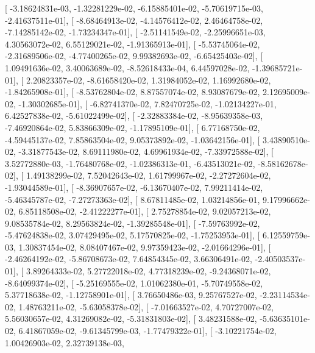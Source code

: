 \documentclass{article}
\begin{document}
       [ -3.18624831e-03,  -1.32281229e-02,  -6.15885401e-02,
         -5.70619715e-03,  -2.41637511e-01],
       [ -8.68464913e-02,  -4.14576412e-02,   2.46464758e-02,
         -7.14285142e-02,  -1.73234347e-01],
       [ -2.51141549e-02,  -2.25996651e-03,   4.30563072e-02,
          6.55129021e-02,  -1.91365913e-01],
       [ -5.53745064e-02,  -2.31689506e-02,  -4.77400265e-02,
          9.99382693e-02,  -6.65425403e-02],
       [  1.09491636e-02,   3.40063689e-02,  -8.52618433e-04,
          6.44597028e-02,  -1.39685721e-01],
       [  2.20823357e-02,  -8.61658420e-02,   1.31984052e-02,
          1.16992680e-02,  -1.84265908e-01],
       [ -8.53762804e-02,   8.87557074e-02,   8.93087679e-02,
          2.12695009e-02,  -1.30302685e-01],
       [ -6.82741370e-02,   7.82470725e-02,  -1.02134227e-01,
          6.42527838e-02,  -5.61022499e-02],
       [ -2.32883384e-02,  -8.95639358e-03,  -7.46920864e-02,
          5.83866309e-02,  -1.17895109e-01],
       [  6.77168750e-02,  -4.59445137e-02,   7.85863504e-02,
          9.05373892e-02,  -1.03642156e-01],
       [  3.43890510e-02,  -3.31877543e-02,   8.69111980e-02,
          4.69961934e-02,  -7.33972588e-02],
       [  3.52772880e-03,  -1.76480768e-02,  -1.02386313e-01,
         -6.43513021e-02,  -8.58162678e-02],
       [  1.49138299e-02,   7.52042643e-02,   1.61799967e-02,
         -2.27272604e-02,  -1.93044589e-01],
       [ -8.36907657e-02,  -6.13670407e-02,   7.99211414e-02,
         -5.46345787e-02,  -7.27273363e-02],
       [  8.67811485e-02,   1.03214856e-01,   9.17996662e-02,
          6.85118508e-02,  -2.41222277e-01],
       [  2.75278854e-02,   9.02057213e-02,   9.08535784e-02,
          8.29563824e-02,  -1.39285548e-01],
       [ -7.59763992e-02,  -5.47624838e-02,   3.07429495e-02,
          5.17570825e-02,  -1.75253953e-01],
       [  6.12559759e-03,   1.30837454e-02,   8.08407467e-02,
          9.97359423e-02,  -2.01664296e-01],
       [ -2.46264192e-02,  -5.86708673e-02,   7.64854345e-02,
          3.66306491e-02,  -2.40503537e-01],
       [  3.89264333e-02,   5.27722018e-02,   4.77318239e-02,
         -9.24368071e-02,  -8.64099374e-02],
       [ -5.25169555e-02,   1.01062380e-01,  -5.70749558e-02,
          5.37718638e-02,  -1.12758901e-01],
       [  3.76650486e-03,   9.25767527e-02,  -2.23114534e-02,
          1.48763211e-02,  -5.63058378e-02],
       [ -7.01663527e-02,   4.70727007e-02,   5.56030657e-02,
          4.31269082e-02,  -5.31831803e-02],
       [  3.48231588e-02,  -5.63635101e-02,   6.41867059e-02,
         -9.61345799e-03,  -1.77479322e-01],
       [ -3.10221754e-02,   1.00426903e-02,   2.32739138e-03,
\end{document}
